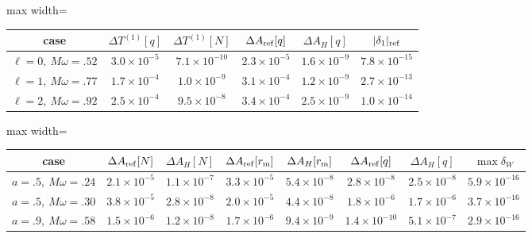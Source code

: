 \documentclass[UTF8,fontset=fandol,11pt,a4paper]{ctexart}
\begin{document}
\par\addvspace{12pt}\noindent\begin{minipage}{\linewidth}
\centering\fontsize{9.5}{12}\selectfont\setlength{\tabcolsep}{3pt}\renewcommand{\arraystretch}{1.18}
\label{audit:tab:tail-convergence}
\begin{adjustbox}{max width=\linewidth}
\begin{tabular}{c c c c c c}
\toprule
case & $\Delta T^{(1)}[q]$ & $\Delta T^{(1)}[N]$
& $\Delta A_{\rm ref}[q]$ & $\Delta A_H[q]$ & $|\delta_1|_{\rm ref}$\\
\midrule
$\ell=0,\ M\omega=.52$ & $3.0\times10^{-5}$ & $7.1\times10^{-10}$ & $2.3\times10^{-5}$ & $1.6\times10^{-9}$ & $7.8\times10^{-15}$\\
$\ell=1,\ M\omega=.77$ & $1.7\times10^{-4}$ & $1.0\times10^{-9}$ & $3.1\times10^{-4}$ & $1.2\times10^{-9}$ & $2.7\times10^{-13}$\\
$\ell=2,\ M\omega=.92$ & $2.5\times10^{-4}$ & $9.5\times10^{-8}$ & $3.4\times10^{-4}$ & $2.5\times10^{-9}$ & $1.0\times10^{-14}$\\
\bottomrule\end{tabular}\end{adjustbox}
\end{minipage}\par\addvspace{9pt}


\par\addvspace{12pt}\noindent\begin{minipage}{\linewidth}
\centering\fontsize{9.5}{12}\selectfont\setlength{\tabcolsep}{3pt}\renewcommand{\arraystretch}{1.18}
\label{audit:tab:convergence}
\begin{adjustbox}{max width=\linewidth}
\begin{tabular}{c c c c c c c c}
\toprule
case & $\Delta A_{\rm ref}[N]$ & $\Delta A_H[N]$
& $\Delta A_{\rm ref}[r_{\rm m}]$ & $\Delta A_H[r_{\rm m}]$
& $\Delta A_{\rm ref}[q]$ & $\Delta A_H[q]$ & $\max\delta_W$\\
\midrule
$a=.5,\ M\omega=.24$ & $2.1\times10^{-5}$ & $1.1\times10^{-7}$
& $3.3\times10^{-5}$ & $5.4\times10^{-8}$ & $2.8\times10^{-8}$
& $2.5\times10^{-8}$ & $5.9\times10^{-16}$\\
$a=.5,\ M\omega=.30$ & $3.8\times10^{-5}$ & $2.8\times10^{-8}$
& $2.0\times10^{-5}$ & $4.4\times10^{-8}$ & $1.8\times10^{-6}$
& $1.7\times10^{-6}$ & $3.7\times10^{-16}$\\
$a=.9,\ M\omega=.58$ & $1.5\times10^{-6}$ & $1.2\times10^{-8}$
& $1.7\times10^{-6}$ & $9.4\times10^{-9}$ & $1.4\times10^{-10}$
& $5.1\times10^{-7}$ & $2.9\times10^{-16}$\\
\bottomrule\end{tabular}\end{adjustbox}
\end{minipage}\par\addvspace{9pt}
\end{document}
